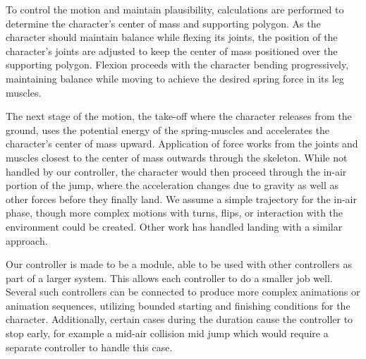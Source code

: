 To control the motion and maintain plausibility, calculations are performed to determine the character's center of mass and supporting polygon.  As the character should maintain balance while flexing its joints, the position of the character's joints are adjusted to keep the center of mass positioned over the supporting polygon.  Flexion proceeds with the character bending progressively, maintaining balance while moving to achieve the desired spring force in its leg muscles.

The next stage of the motion, the take-off where the character releases from the ground, uses the potential energy of the spring-muscles and accelerates the character's center of mass upward.  Application of force works from the joints and muscles closest to the center of mass outwards through the skeleton.  While not handled by our controller, the character would then proceed through the in-air portion of the jump, where the acceleration changes due to gravity as well as other forces before they finally land.  We assume a simple trajectory for the in-air phase, though more complex motions with turns, flips, or interaction with the environment could be created.  Other work has handled landing with a similar approach. \cite{falling_landing}

Our controller is made to be a module, able to be used with other controllers as part of a larger system.  This allows each controller to do a smaller job well. Several such controllers can be connected to produce more complex animations or animation sequences, utilizing bounded starting and finishing conditions for the character. Additionally, certain cases during the duration cause the controller to stop early, for example a mid-air collision mid jump which would require a separate controller to handle this case. \cite{composable_controllers}


